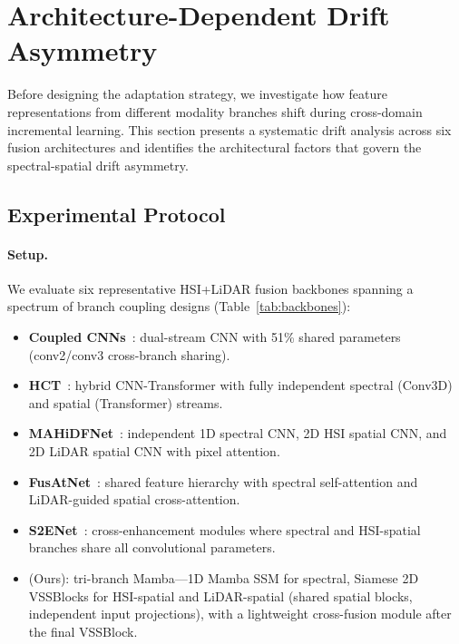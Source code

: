 \section{Architecture-Dependent Drift Asymmetry}
\label{sec:observation}

Before designing the adaptation strategy, we investigate how feature representations from different modality branches shift during cross-domain incremental learning.
This section presents a systematic drift analysis across six fusion architectures and identifies the architectural factors that govern the spectral-spatial drift asymmetry.

\subsection{Experimental Protocol}
\label{sec:obs_protocol}

\paragraph{Setup.}
We evaluate six representative HSI+LiDAR fusion backbones spanning a spectrum of branch coupling designs (Table~\ref{tab:backbones}):
\begin{itemize}
    \item \textbf{Coupled CNNs}~\cite{hang2020coupled}: dual-stream CNN with 51\% shared parameters (conv2/conv3 cross-branch sharing).
    \item \textbf{HCT}~\cite{ghosh2023hct}: hybrid CNN-Transformer with fully independent spectral (Conv3D) and spatial (Transformer) streams.
    \item \textbf{MAHiDFNet}~\cite{li2022mahidfnet}: independent 1D spectral CNN, 2D HSI spatial CNN, and 2D LiDAR spatial CNN with pixel attention.
    \item \textbf{FusAtNet}~\cite{mohla2020fusatnet}: shared feature hierarchy with spectral self-attention and LiDAR-guided spatial cross-attention.
    \item \textbf{S2ENet}~\cite{fang2022s2enet}: cross-enhancement modules where spectral and HSI-spatial branches share all convolutional parameters.
    \item \textbf{\backbonename{}} (Ours): tri-branch Mamba---1D Mamba SSM for spectral, Siamese 2D VSSBlocks for HSI-spatial and LiDAR-spatial (shared spatial blocks, independent input projections), with a lightweight cross-fusion module after the final VSSBlock.
\end{itemize}

